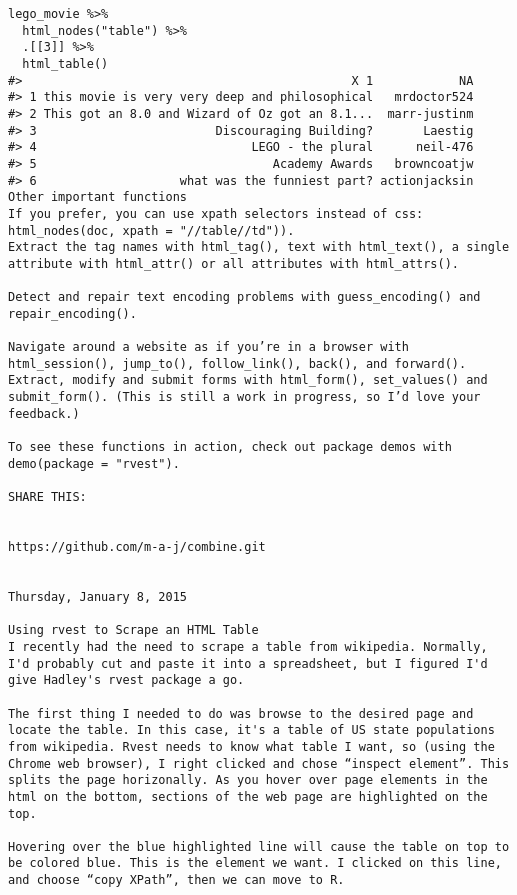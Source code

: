 \begin{frame}
\begin{framed}
\begin{verbatim}
lego_movie %>%
  html_nodes("table") %>%
  .[[3]] %>%
  html_table()
#>                                              X 1            NA
#> 1 this movie is very very deep and philosophical   mrdoctor524
#> 2 This got an 8.0 and Wizard of Oz got an 8.1...  marr-justinm
#> 3                         Discouraging Building?       Laestig
#> 4                              LEGO - the plural      neil-476
#> 5                                 Academy Awards   browncoatjw
#> 6                    what was the funniest part? actionjacksin
Other important functions
If you prefer, you can use xpath selectors instead of css: html_nodes(doc, xpath = "//table//td")).
Extract the tag names with html_tag(), text with html_text(), a single attribute with html_attr() or all attributes with html_attrs().

Detect and repair text encoding problems with guess_encoding() and repair_encoding().

Navigate around a website as if you’re in a browser with html_session(), jump_to(), follow_link(), back(), and forward(). Extract, modify and submit forms with html_form(), set_values() and submit_form(). (This is still a work in progress, so I’d love your feedback.)

To see these functions in action, check out package demos with demo(package = "rvest").

SHARE THIS:


https://github.com/m-a-j/combine.git


Thursday, January 8, 2015

Using rvest to Scrape an HTML Table
I recently had the need to scrape a table from wikipedia. Normally, I'd probably cut and paste it into a spreadsheet, but I figured I'd give Hadley's rvest package a go.

The first thing I needed to do was browse to the desired page and locate the table. In this case, it's a table of US state populations from wikipedia. Rvest needs to know what table I want, so (using the Chrome web browser), I right clicked and chose “inspect element”. This splits the page horizonally. As you hover over page elements in the html on the bottom, sections of the web page are highlighted on the top.

Hovering over the blue highlighted line will cause the table on top to be colored blue. This is the element we want. I clicked on this line, and choose “copy XPath”, then we can move to R.


\end{verbatim}
\end{framed}
\end{frame}
